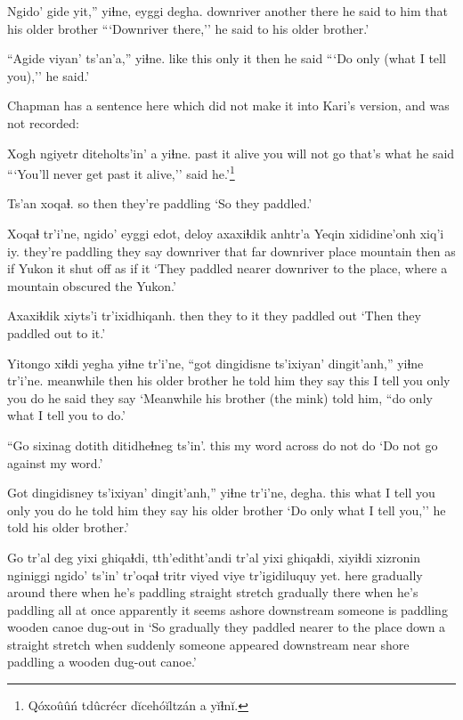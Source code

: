 \documentclass[12pt]{article}
\begin{document}
\gll Ngido'  gide  yit,'' yiɬne, eyggi degha.
downriver another there {he said to him} that {his older brother}
\glt ```Downriver there,'' he said to his older brother.'
\glend

\gll ``Agide  viyan'  ts'an'a,'' yiɬne.
{like this} {only it} then {he said}
\glt ```Do only (what I tell you),'' he said.'
\glend

Chapman has a sentence here which did not make it into Kari's version, and was not recorded:

\gll Xogh ngiyetr diteholts'in' a yiɬne.
{past it} alive {you will not go} {that's what} {he said}
\glt ```You'll never get past it alive,'' said he.'\footnote{Q\'oxo\^u\^u\'n td\^ucr\'ecr d\u{i}ceh\'o\u{i}ltz\'an a y\u{i}ɬn\u{i}.}
\glend

\gll Ts'an  xoqaɬ.
{so then} {they're paddling} 
\glt `So they paddled.'
\glend

\gll Xoqaɬ  tr'i'ne, ngido' eyggi edot, deloy  axaxiɬdik anhtr'a Yeqin xididine'onh xiq'i iy.
{they're paddling} {they say} downriver that {far downriver place} mountain then {as if} Yukon {it shut off} {as if} it
\glt `They paddled nearer downriver to the place, where a mountain obscured the Yukon.'
\glend

\gll Axaxiɬdik xiyts'i tr'ixidhiqanh.
{then} {they to it} {they paddled out}
\glt `Then they paddled out to it.'
\glend

\gll Yitongo xiɬdi yegha  yiɬne  tr'i'ne, ``got dingidisne ts'ixiyan' dingit'anh,''  yiɬne  tr'i'ne.
meanwhile then {his older brother} {he told him} {they say} this {I tell you} only {you do} {he said} {they say}
\glt `Meanwhile his brother (the mink) told him, ``do only what I tell you to do.'
\glend

\gll ``Go sixinag dotith {ditidheɬneg ts'in'.}
this {my word} across {do not do}
\glt `Do not go against my word.'
\glend

\gll Got dingidisney ts'ixiyan' dingit'anh,'' yiɬne  tr'i'ne, degha.
this {what I tell you} only {you do} {he told him} {they say} {his older brother}
\glt `Do only what I tell you,'' he told his older brother.'
\glend

\gll Go tr'al  {deg yixi} ghiqaɬdi, tth'editht'andi tr'al yixi ghiqaɬdi, xiyiɬdi  xizronin nginiggi {ngido' ts'in'} tr'oqaɬ  tritr  viyed {viye tr'igidiluquy} yet.
here gradually {around there} {when he's paddling} {straight stretch} gradually there {when he's paddling} {all at once} apparently {it seems} ashore  downstream {someone is paddling} wooden canoe dug-out in
\glt `So gradually they paddled nearer to the place down a straight stretch when suddenly someone appeared downstream near shore paddling a wooden dug-out canoe.'
\glend
\end{document}
